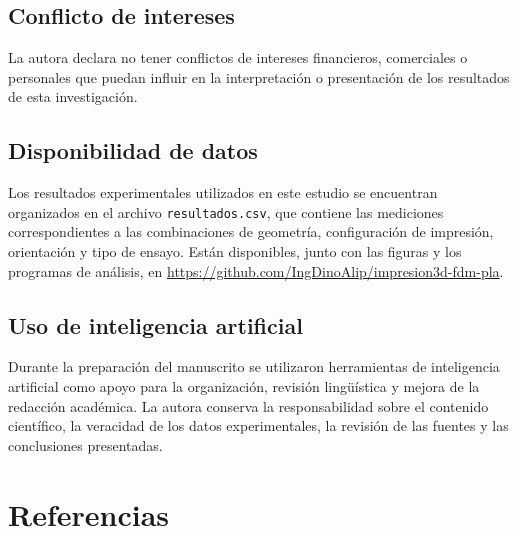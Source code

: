 \documentclass[10pt,twocolumn]{article}
\begin{document}
\subsection{Conflicto de intereses}
La autora declara no tener conflictos de intereses financieros, comerciales o personales que puedan influir en la interpretación o presentación de los resultados de esta investigación.
\subsection{Disponibilidad de datos}
Los resultados experimentales utilizados en este estudio se encuentran organizados en el archivo \texttt{resultados.csv}, que contiene las mediciones correspondientes a las combinaciones de geometría, configuración de impresión, orientación y tipo de ensayo. Están disponibles, junto con las figuras y los programas de análisis, en \url{https://github.com/IngDinoAlip/impresion3d-fdm-pla}.
\subsection{Uso de inteligencia artificial}
Durante la preparación del manuscrito se utilizaron herramientas de inteligencia artificial como apoyo para la organización, revisión lingüística y mejora de la redacción académica. La autora conserva la responsabilidad sobre el contenido científico, la veracidad de los datos experimentales, la revisión de las fuentes y las conclusiones presentadas.
\section{Referencias}
{\footnotesize\setlength{\parindent}{-1.2em}\setlength{\leftskip}{1.2em}\raggedright
}

\end{document}
